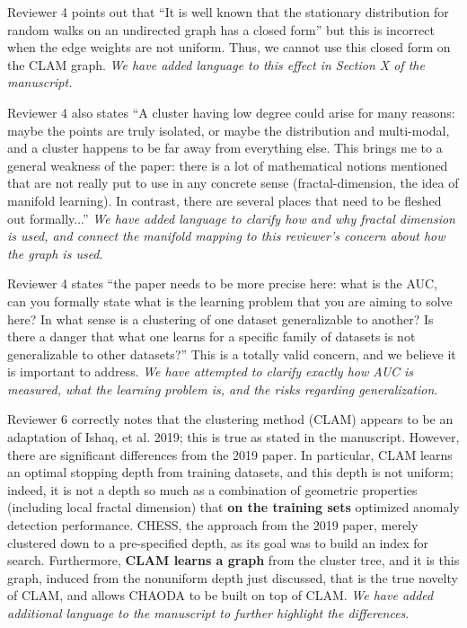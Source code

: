 \documentclass{article}
\begin{document}
Reviewer 4 points out that ``It is well known that the stationary distribution for random walks on an undirected graph has a closed form'' but this is incorrect when the edge weights are not uniform.
Thus, we cannot use this closed form on the CLAM graph.
\emph{We have added language to this effect in Section X of the manuscript.}

Reviewer 4 also states ``A cluster having low degree could arise for many reasons: maybe the points are truly isolated, or maybe the distribution and multi-modal, and a cluster happens to be far away from everything else. 
This brings me to a general weakness of the paper: there is a lot of mathematical notions mentioned that are not really put to use in any concrete sense (fractal-dimension, the idea of manifold learning). In contrast, there are several places that need to be fleshed out formally...''
\emph{We have added language to clarify how and why fractal dimension is used, and connect the manifold mapping to this reviewer's concern about how the graph is used}.

Reviewer 4 states ``the paper needs to be more precise here: what is the AUC, can you formally state what is the learning problem that you are aiming to solve here? In what sense is a clustering of one dataset generalizable to another? Is there a danger that what one learns for a specific family of datasets is not generalizable to other datasets?''
This is a totally valid concern, and we believe it is important to address.
\emph{We have attempted to clarify exactly how AUC is measured, what the learning problem is, and the risks regarding generalization}.

Reviewer 6 correctly notes that the clustering method (CLAM) appears to be an adaptation of Ishaq, et al. 2019; this is true as stated in the manuscript.
However, there are significant differences from the 2019 paper.
In particular, CLAM learns an optimal stopping depth from training datasets, and this depth is not uniform; indeed, it is not a depth so much as a combination of geometric properties (including local fractal dimension) that \textbf{on the training sets} optimized anomaly detection performance. CHESS, the approach from the 2019 paper, merely clustered down to a pre-specified depth, as its goal was to build an index for search.
Furthermore, \textbf{CLAM learns a graph} from the cluster tree, and it is this graph, induced from the nonuniform depth just discussed, that is the true novelty of CLAM, and allows CHAODA to be built on top of CLAM.
\emph{We have added additional language to the manuscript to further highlight the differences}.
\end{document}
